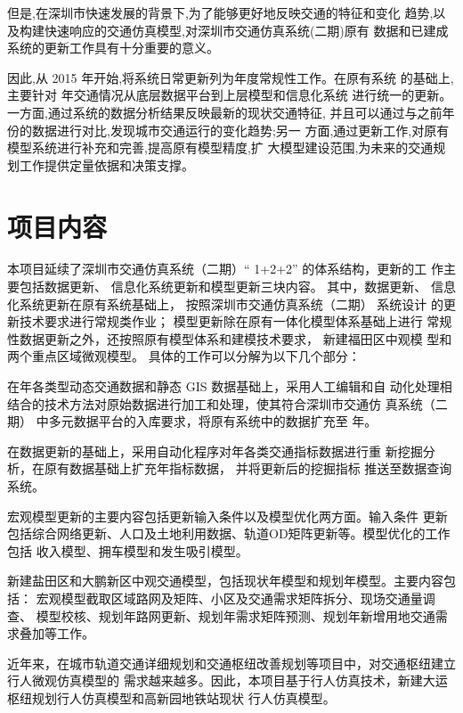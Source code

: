 但是,在深圳市快速发展的背景下,为了能够更好地反映交通的特征和变化
趋势,以及构建快速响应的交通仿真模型,对深圳市交通仿真系统(二期)原有
数据和已建成系统的更新工作具有十分重要的意义。

因此,从 2015 年开始,将系统日常更新列为年度常规性工作。在原有系统
的基础上,主要针对 \pyear 年交通情况从底层数据平台到上层模型和信息化系统
进行统一的更新。一方面,通过系统的数据分析结果反映最新的现状交通特征,
并且可以通过与之前年份的数据进行对比,发现城市交通运行的变化趋势;另一
方面,通过更新工作,对原有模型系统进行补充和完善,提高原有模型精度,扩
大模型建设范围,为未来的交通规划工作提供定量依据和决策支撑。

\section{项目内容}
本项目延续了深圳市交通仿真系统（二期）“ 1+2+2” 的体系结构，更新的工
作主要包括数据更新、 信息化系统更新和模型更新三块内容。 其中，数据更新、
信息化系统更新在原有系统基础上， 按照深圳市交通仿真系统（二期） 系统设计
的更新技术要求进行常规类作业； 模型更新除在原有一体化模型体系基础上进行
常规性数据更新之外，还按照原有模型体系和建模技术要求， 新建福田区中观模
型和两个重点区域微观模型。 具体的工作可以分解为以下几个部分：

在\pyear 年各类型动态交通数据和静态 GIS 数据基础上，采用人工编辑和自
动化处理相结合的技术方法对原始数据进行加工和处理，使其符合深圳市交通仿
真系统（二期） 中多元数据平台的入库要求，将原有系统中的数据扩充至 \pyear
年。

在数据更新的基础上，采用自动化程序对\pyear 年各类交通指标数据进行重
新挖掘分析，在原有数据基础上扩充\pyear 年指标数据， 并将更新后的挖掘指标
推送至数据查询系统。

宏观模型更新的主要内容包括更新输入条件以及模型优化两方面。输入条件
更新包括综合网络更新、人口及土地利用数据、轨道OD矩阵更新等。模型优化的工作包括
收入模型、拥车模型和发生吸引模型。

新建盐田区和大鹏新区中观交通模型，包括现状年模型和规划年模型。主要内容包括：
宏观模型截取区域路网及矩阵、小区及交通需求矩阵拆分、现场交通量调查、
模型校核、规划年路网更新、规划年需求矩阵预测、规划年新增用地交通需求叠加等工作。

近年来，在城市轨道交通详细规划和交通枢纽改善规划等项目中，对交通枢纽建立行人微观仿真模型的
需求越来越多。因此，本项目基于行人仿真技术，新建大运枢纽规划行人仿真模型和高新园地铁站现状
行人仿真模型。

